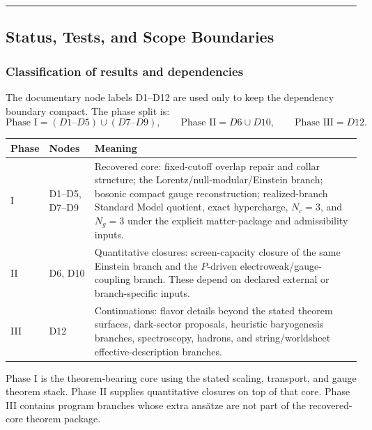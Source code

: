 \begin{center}\rule{0.5\linewidth}{0.5pt}\end{center}
\subsection{Status, Tests, and Scope Boundaries}\label{8-status-tests-and-open-problems}

\subsubsection{Classification of results and dependencies}\label{81-classification-of-results}\label{16-summary-complete-axiom-set}

The documentary node labels D1--D12 are used only to keep the dependency boundary compact. The
phase split is:
\[
\text{Phase I}=(D1\text{--}D5)\cup(D7\text{--}D9),\qquad
\text{Phase II}=D6\cup D10,\qquad
\text{Phase III}=D12.
\]

\begin{center}
\scriptsize
\setlength{\tabcolsep}{3pt}
\begin{tabular}{@{}>{\RaggedRight\arraybackslash}p{}>{\RaggedRight\arraybackslash}p{}>{\RaggedRight\arraybackslash}p{}@{}}
\toprule
Phase & Nodes & Meaning \\
\midrule
I & D1--D5, D7--D9 & Recovered core: fixed-cutoff overlap repair and collar structure; the Lorentz/null-modular/Einstein branch; bosonic compact gauge reconstruction; realized-branch Standard Model quotient, exact hypercharge, \(N_c=3\), and \(N_g=3\) under the explicit matter-package and admissibility inputs. \\
II & D6, D10 & Quantitative closures: screen-capacity closure of the same Einstein branch and the \(P\)-driven electroweak/gauge-coupling branch. These depend on declared external or branch-specific inputs. \\
III & D12 & Continuations: flavor details beyond the stated theorem surfaces, dark-sector proposals, heuristic baryogenesis branches, spectroscopy, hadrons, and string/worldsheet effective-description branches. \\
\bottomrule
\end{tabular}
\end{center}

Phase I is the theorem-bearing core using the stated scaling, transport, and gauge theorem stack.
Phase II supplies quantitative closures on top of that core. Phase III contains
program branches whose extra ans\"atze are not part of the recovered-core theorem package.

